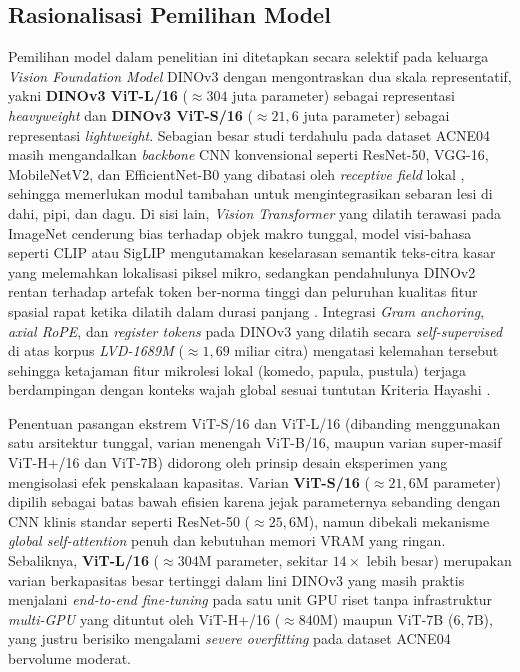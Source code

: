 \subsection{Rasionalisasi Pemilihan Model}
Pemilihan model dalam penelitian ini ditetapkan secara selektif pada keluarga \textit{Vision Foundation Model} DINOv3 dengan mengontraskan dua skala representatif, yakni \textbf{DINOv3 ViT-L/16} ($\approx 304$ juta parameter) sebagai representasi \textit{heavyweight} dan \textbf{DINOv3 ViT-S/16} ($\approx 21,6$ juta parameter) sebagai representasi \textit{lightweight}. Sebagian besar studi terdahulu pada dataset ACNE04 masih mengandalkan \textit{backbone} CNN konvensional seperti ResNet-50, VGG-16, MobileNetV2, dan EfficientNet-B0 yang dibatasi oleh \textit{receptive field} lokal \cite{wu2019, lin2022, zeng2026}, sehingga memerlukan modul tambahan untuk mengintegrasikan sebaran lesi di dahi, pipi, dan dagu. Di sisi lain, \textit{Vision Transformer} yang dilatih terawasi pada ImageNet cenderung bias terhadap objek makro tunggal, model visi-bahasa seperti CLIP atau SigLIP mengutamakan keselarasan semantik teks-citra kasar yang melemahkan lokalisasi piksel mikro, sedangkan pendahulunya DINOv2 rentan terhadap artefak token ber-norma tinggi dan peluruhan kualitas fitur spasial rapat ketika dilatih dalam durasi panjang \cite{oquab2023dinov2}. Integrasi \textit{Gram anchoring}, \textit{axial RoPE}, dan \textit{register tokens} pada DINOv3 yang dilatih secara \textit{self-supervised} di atas korpus \textit{LVD-1689M} ($\approx 1,69$ miliar citra) mengatasi kelemahan tersebut sehingga ketajaman fitur mikrolesi lokal (komedo, papula, pustula) terjaga berdampingan dengan konteks wajah global sesuai tuntutan Kriteria Hayashi \cite{hayashi2008, simeoni2025dinov3}.

Penentuan pasangan ekstrem ViT-S/16 dan ViT-L/16 (dibanding menggunakan satu arsitektur tunggal, varian menengah ViT-B/16, maupun varian super-masif ViT-H+/16 dan ViT-7B) didorong oleh prinsip desain eksperimen yang mengisolasi efek penskalaan kapasitas. Varian \textbf{ViT-S/16} ($\approx 21,6\text{M}$ parameter) dipilih sebagai batas bawah efisien karena jejak parameternya sebanding dengan CNN klinis standar seperti ResNet-50 ($\approx 25,6\text{M}$), namun dibekali mekanisme \textit{global self-attention} penuh dan kebutuhan memori VRAM yang ringan. Sebaliknya, \textbf{ViT-L/16} ($\approx 304\text{M}$ parameter, sekitar $14\times$ lebih besar) merupakan varian berkapasitas besar tertinggi dalam lini DINOv3 yang masih praktis menjalani \textit{end-to-end fine-tuning} pada satu unit GPU riset tanpa infrastruktur \textit{multi-GPU} yang dituntut oleh ViT-H+/16 ($\approx 840\text{M}$) maupun ViT-7B ($6,7\text{B}$), yang justru berisiko mengalami \textit{severe overfitting} pada dataset ACNE04 bervolume moderat.

